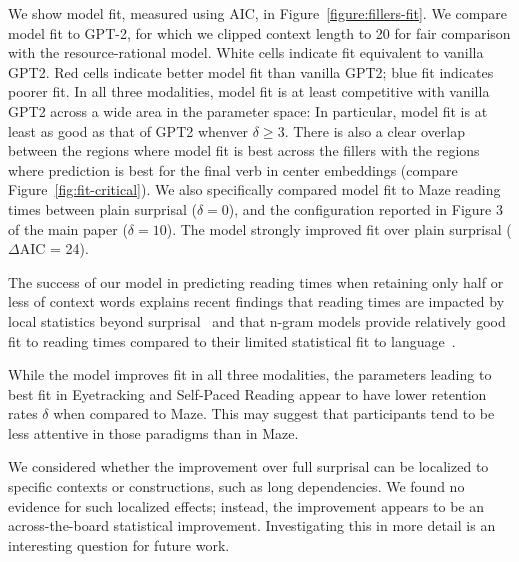 We show model fit, measured using AIC, in Figure~\ref{figure:fillers-fit}.
We compare model fit to GPT-2, for which we clipped context length to 20 for fair comparison with the resource-rational model.
White cells indicate fit equivalent to vanilla GPT2.
Red cells indicate better model fit than vanilla GPT2; blue fit indicates poorer fit.
In all three modalities, model fit is at least competitive with vanilla GPT2 across a wide area in the parameter space:
In particular, model fit is at least as good as that of GPT2 whenver $\delta \geq 3$. 
There is also a clear overlap between the regions where model fit is best across the fillers with the regions where prediction is best for the final verb in center embeddings (compare Figure~\ref{fig:fit-critical}).
We also specifically compared model fit to Maze reading times between plain surprisal ($\delta=0$), and the configuration reported in Figure 3 of the main paper ($\delta=10$). 
The model strongly improved fit over plain surprisal ($\Delta$AIC = 24).



The success of our model in predicting reading times when retaining only half or less of context words explains recent findings that reading times are impacted by local statistics beyond surprisal~\citep{DBLP:journals/corr/abs-2103-04469} and that n-gram models provide relatively good fit to reading times compared to their limited statistical fit to language~\citep{DBLP:conf/cogsci/WilcoxGHQL20}.




While the model improves fit in all three modalities, the parameters leading to best fit in Eyetracking and Self-Paced Reading appear to have lower retention rates $\delta$ when compared to Maze.
This may suggest that participants tend to be less attentive in those paradigms than in Maze.

We considered whether the improvement over full surprisal can be localized to specific contexts or constructions, such as long dependencies. We found no evidence for such localized effects; instead, the improvement appears to be an across-the-board statistical improvement. Investigating this in more detail is an interesting question for future work.


